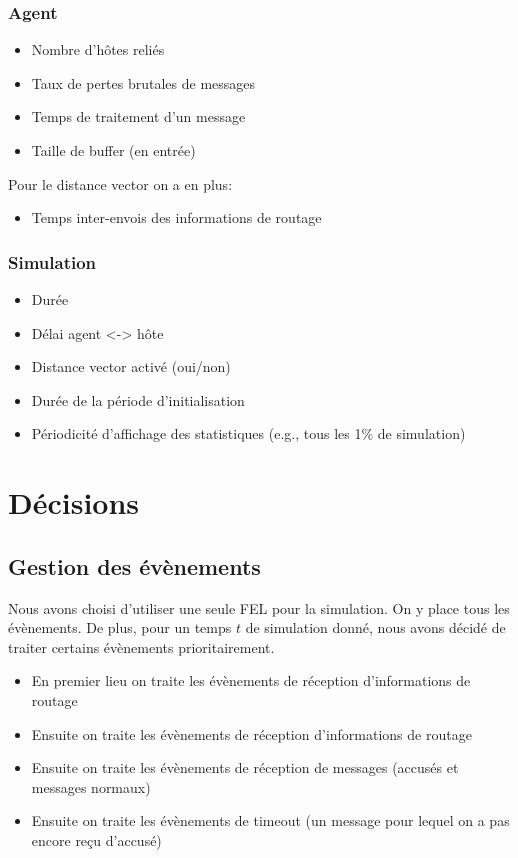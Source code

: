 \documentclass[a4paper,11pt]{article}
\begin{document}
\subsubsection{Agent}

\begin{itemize}
 \item Nombre d'hôtes reliés
 \item Taux de pertes brutales de messages
 \item Temps de traitement d'un message
 \item Taille de buffer (en entrée)
\end{itemize}

Pour le distance vector on a en plus:
\begin{itemize}
 \item Temps inter-envois des informations de routage
\end{itemize}

\subsubsection{Simulation}
\begin{itemize}
 \item Durée
 \item Délai agent <-> hôte
 \item Distance vector activé (oui/non)
 \item Durée de la période d'initialisation
 \item Périodicité d'affichage des statistiques (e.g., tous les 1\% de simulation)
\end{itemize}



\section{Décisions}

\subsection{Gestion des évènements}
Nous avons choisi d'utiliser une seule FEL pour la simulation. On y place tous les évènements. De plus, pour un temps $t$ de simulation donné, nous avons décidé de traiter certains évènements prioritairement.

\begin{itemize}
 \item En premier lieu on traite les évènements de réception d'informations de routage
 \item Ensuite on traite les évènements de réception d'informations de routage
 \item Ensuite on traite les évènements de réception de messages (accusés et messages normaux)
 \item Ensuite on traite les évènements de timeout (un message pour lequel on a pas encore reçu d'accusé)
\end{itemize}
\end{document}
